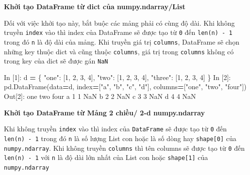 \documentclass[
]{book}
\newenvironment{Shaded}{\begin{snugshade}}{\end{snugshade}}
\newcommand{\DecValTok}[1]{\textcolor[rgb]{0.00,0.00,0.81}{#1}}
\newcommand{\NormalTok}[1]{#1}
\newcommand{\OperatorTok}[1]{\textcolor[rgb]{0.81,0.36,0.00}{\textbf{#1}}}
\newcommand{\StringTok}[1]{\textcolor[rgb]{0.31,0.60,0.02}{#1}}
\begin{document}
\textbf{Khởi tạo DataFrame từ dict của numpy.ndarray/List}

Đối với việc khởi tạo này, bắt buộc các mảng phải có cùng độ dài. Khi không truyền \texttt{index} vào thì
index của DataFrame sẽ được tạo từ \texttt{0} đến \texttt{len(n)\ -\ 1} trong đó \texttt{n} là độ dài của mảng. Khi truyền
giá trị \texttt{columns}, DataFrame sẽ chọn những key thuộc dict và cũng thuộc \texttt{columns}, giá trị trong
\texttt{columns} không có trong key của dict sẽ được gán \texttt{NaN}

\begin{Shaded}
\begin{Highlighting}[]
\NormalTok{In [}\DecValTok{1}\NormalTok{]: d }\OperatorTok{=}\NormalTok{ \{}
            \StringTok{"one"}\NormalTok{: [}\DecValTok{1}\NormalTok{, }\DecValTok{2}\NormalTok{, }\DecValTok{3}\NormalTok{, }\DecValTok{4}\NormalTok{],}
            \StringTok{"two"}\NormalTok{: [}\DecValTok{1}\NormalTok{, }\DecValTok{2}\NormalTok{, }\DecValTok{3}\NormalTok{, }\DecValTok{4}\NormalTok{],}
            \StringTok{"three"}\NormalTok{: [}\DecValTok{1}\NormalTok{, }\DecValTok{2}\NormalTok{, }\DecValTok{3}\NormalTok{, }\DecValTok{4}\NormalTok{]}
\NormalTok{        \}}
\NormalTok{In [}\DecValTok{2}\NormalTok{]: pd.DataFrame(data}\OperatorTok{=}\NormalTok{d,}
\NormalTok{                     index}\OperatorTok{=}\NormalTok{[}\StringTok{"a"}\NormalTok{, }\StringTok{"b"}\NormalTok{, }\StringTok{"c"}\NormalTok{, }\StringTok{"d"}\NormalTok{],}
\NormalTok{                     columns}\OperatorTok{=}\NormalTok{[}\StringTok{"one"}\NormalTok{, }\StringTok{"two"}\NormalTok{, }\StringTok{"four"}\NormalTok{])}
\NormalTok{Out[}\DecValTok{2}\NormalTok{]:}
\NormalTok{   one  two four}
\NormalTok{a    }\DecValTok{1}    \DecValTok{1}\NormalTok{   NaN}
\NormalTok{b    }\DecValTok{2}    \DecValTok{2}\NormalTok{   NaN}
\NormalTok{c    }\DecValTok{3}    \DecValTok{3}\NormalTok{   NaN}
\NormalTok{d    }\DecValTok{4}    \DecValTok{4}\NormalTok{   NaN}
\end{Highlighting}
\end{Shaded}

\textbf{Khởi tạo DataFrame từ Mảng 2 chiều/ 2-d numpy.ndarray}

Khi không truyền \texttt{index} vào thì index của \texttt{DataFrame} sẽ được tạo từ \texttt{0} đến \texttt{len(n)\ -\ 1} trong đó \texttt{n}
là số lượng List con hoặc là số dòng hay \texttt{shape{[}0{]}} của \texttt{numpy.ndarray}. Khi không truyền \texttt{columns}
thì tên columns sẽ được tạo từ \texttt{0} đến \texttt{len(n)\ -\ 1} với \texttt{n} là độ dài lớn nhất của List con hoặc \texttt{shape{[}1{]}}
của \texttt{numpy.ndarray}
\end{document}
